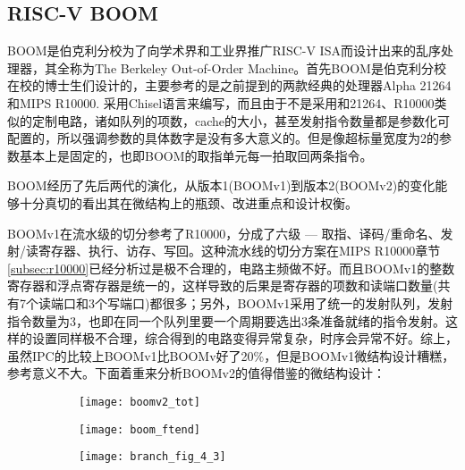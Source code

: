 	\subsection{RISC-V BOOM}\label{subsec:BOOM}
	
	BOOM是伯克利分校为了向学术界和工业界推广RISC-V ISA而设计出来的乱序处理器，其全称为The Berkeley Out-of-Order Machine。首先BOOM是伯克利分校在校的博士生们设计的，主要参考的是之前提到的两款经典的处理器Alpha 21264和MIPS R10000. 采用Chisel语言来编写，而且由于不是采用和21264、R10000类似的定制电路，诸如队列的项数，cache的大小，甚至发射指令数量都是参数化可配置的，所以强调参数的具体数字是没有多大意义的。但是像超标量宽度为2的参数基本上是固定的，也即BOOM的取指单元每一拍取回两条指令。
	
	BOOM经历了先后两代的演化，从版本1(BOOMv1)到版本2(BOOMv2)的变化能够十分真切的看出其在微结构上的瓶颈、改进重点和设计权衡。
	
	BOOMv1在流水级的切分参考了R10000，分成了六级 --- 取指、译码/重命名、发射/读寄存器、执行、访存、写回\citep{Celio:EECS-2017-157}。这种流水线的切分方案在MIPS R10000章节\ref{subsec:r10000}已经分析过是极不合理的，电路主频做不好。而且BOOMv1的整数寄存器和浮点寄存器是统一的，这样导致的后果是寄存器的项数和读端口数量(共有7个读端口和3个写端口)都很多；另外，BOOMv1采用了统一的发射队列，发射指令数量为3，也即在同一个队列里要一个周期要选出3条准备就绪的指令发射\citep{Celio:EECS-2017-157}。这样的设置同样极不合理，综合得到的电路变得异常复杂，时序会异常不好。综上，虽然IPC的比较上BOOMv1比BOOMv好了20\%\citep{Celio:EECS-2017-157}，但是BOOMv1微结构设计糟糕，参考意义不大。下面着重来分析BOOMv2的值得借鉴的微结构设计：
	\begin{figure}[!htbp]
	\centering
		\begin{subfigure}[b]{.45\textwidth}
			\texttt{[image: boomv2\_tot]}
			\caption{}
			\label{fig:boom_total}
		\end{subfigure}\qquad
		\begin{subfigure}[b]{.45\textwidth}
			\texttt{[image: boom\_ftend]}
			\caption{}
			\label{fig:boom_ftend}
			
			\vspace{2ex}
			
			\texttt{[image: branch\_fig\_4\_3]}
			\caption{}
			\label{fig:boom_predictor}
		\end{subfigure}
		\label{fig:boomv2}
	\end{figure}

